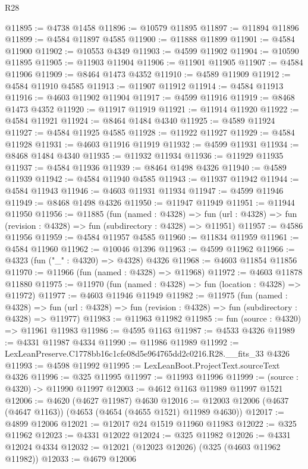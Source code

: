 \begin{lexlean}{R28}
\begin{coremodule}
@11895 := @4738 @1458
@11896 := @10579 @11895
@11897 := @11894 @11896
@11899 := @4584 @11897 @4585
@11900 := @11888 @11899
@11901 := @4584 @11900
@11902 := @10553 @4349
@11903 := @4599 @11902
@11904 := @10590 @11895
@11905 := @11903 @11904
@11906 := @11901 @11905
@11907 := @4584 @11906
@11909 := @8464 @1473 @4352
@11910 := @4589 @11909
@11912 := @4584 @11910 @4585
@11913 := @11907 @11912
@11914 := @4584 @11913
@11916 := @4603 @11902 @11904
@11917 := @4599 @11916
@11919 := @8468 @1473 @4352
@11920 := @11917 @11919
@11921 := @11914 @11920
@11922 := @4584 @11921
@11924 := @8464 @1484 @4340
@11925 := @4589 @11924
@11927 := @4584 @11925 @4585
@11928 := @11922 @11927
@11929 := @4584 @11928
@11931 := @4603 @11916 @11919
@11932 := @4599 @11931
@11934 := @8468 @1484 @4340
@11935 := @11932 @11934
@11936 := @11929 @11935
@11937 := @4584 @11936
@11939 := @8464 @1498 @4326
@11940 := @4589 @11939
@11942 := @4584 @11940 @4585
@11943 := @11937 @11942
@11944 := @4584 @11943
@11946 := @4603 @11931 @11934
@11947 := @4599 @11946
@11949 := @8468 @1498 @4326
@11950 := @11947 @11949
@11951 := @11944 @11950
@11956 := @11885
    (fun (named : @4328) =>
    fun (url : @4328) => fun (revision : @4328) => fun (subdirectory : @4328) => @11951)
@11957 := @4586 @11956
@11959 := @4584 @11957 @4585
@11960 := @11834 @11959
@11961 := @4584 @11960
@11962 := @10046 @1396
@11963 := @4599 @11962
@11966 := @4323 (fun ("_" : @4320) => @4328) @4326
@11968 := @4603 @11854 @11856
@11970 := @11966 (fun (named : @4328) => @11968)
@11972 := @4603 @11878 @11880
@11975 := @11970 (fun (named : @4328) => fun (location : @4328) => @11972)
@11977 := @4603 @11946 @11949
@11982 := @11975
    (fun (named : @4328) =>
    fun (url : @4328) => fun (revision : @4328) => fun (subdirectory : @4328) => @11977)
@11983 := @11963 @11982
@11985 := fun (source : @4320) => @11961 @11983
@11986 := @4595 @1163
@11987 := @4533 @4326
@11989 := @4331 @11987 @4334
@11990 := @11986 @11989
@11992 := LexLeanPreserve.C1778bb16c1cfe08d5e964765dd2c0216.R28.__fits_33 @4326
@11993 := @4598 @11992
@11995 := LexLeanBoot.ProjectText.sourceText @4326
@11996 := @325 @11995
@11997 := @11993 @11996
@11999 := (source : @4320) -> @11990 @11997
@12003 := @4612 @1163 @11989 @11997 @1521
@12006 := @4620 (@4627 @11987) @4630
@12016 := @12003 @12006 (@4637 (@4647 @1163)) (@4653 (@4654 (@4655 @1521) @11989 @4630))
@12017 := @4899 @12006
@12021 := @12017 @24 @1519 @11960 @11983
@12022 := @325 @11962
@12023 := @4331 @12022
@12024 := @325 @11982
@12026 := @4331 @12024 @4334
@12032 := @12021 (@12023 @12026) (@325 (@4603 @11962 @11982))
@12033 := @4679 @12006

\end{coremodule}
\end{lexlean}
